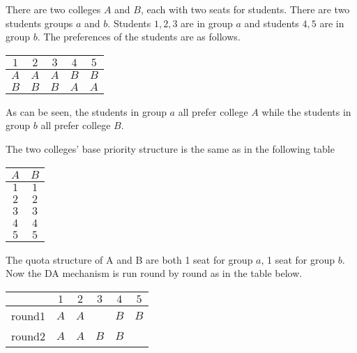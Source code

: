 \begin{example}
There are two colleges $A$ and $B$, each with two seats for students. There are
two students groups $a$ and $b$. Students $1,2,3$ are in group $a$ and
students $4,5$ are in group $b$. The preferences of the students are
as follows.

\begin{center}
  \begin{tabular}{|c|c|c|c|c|}
    \hline
    $1$ & $2$ & $3$ & $4$ & $5$\\
    \hline
    $A$ & $A$ & $A$ & $B$ & $B$ \\
    
    $B$ & $B$ & $B$ & $A$ & $A$ \\
    \hline
    
  \end{tabular}
\end{center}

As can be seen, the students in group $a$ all prefer college $A$ while
the students in group $b$ all prefer college $B$. 

The two colleges' base priority structure is the same as in the following
table

\begin{center}
  \begin{tabular}{|c|c|}
    \hline
    $A$ & $B$ \\
    \hline
    $1$ & $1$\\
    
    $2$ & $2$ \\

    $3$ & $3$ \\

    $4$ & $4$ \\

    $5$ & $5$ \\
    \hline
    
  \end{tabular}
\end{center}
The quota structure
of A and B are both 1 seat for group $a$, 1 seat for group $b$. Now
the DA mechanism is run round by round as in the table below.

\begin{center}
  \begin{tabular}{|c|c|c|c|c|c|}
    \hline
    &$1$ & $2$ & $3$ & $4$ & $5$\\
    \hline
    round1& $A$ & $A$ &  & $B$ & $B$ \\
    
    round2&$A$ & $A$ & $B$ & $B$ &  \\


\end{tabular}
\end{center}
\end{example}
